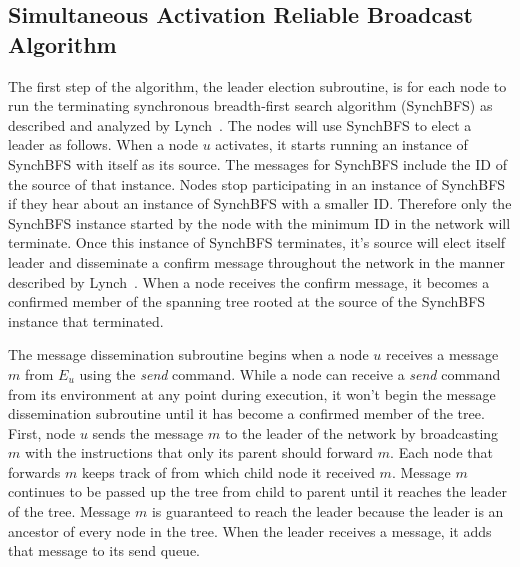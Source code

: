 \documentclass[english]{article}
\begin{document}
  \subsection {Simultaneous Activation Reliable Broadcast Algorithm}

The first step of the algorithm, the leader election subroutine, is for each node to run the terminating synchronous breadth-first search algorithm (SynchBFS) as described and analyzed by Lynch~\cite{Lynch:1996}. The nodes will use SynchBFS to elect a leader as follows. When a node $u$ activates, it starts running an instance of SynchBFS with itself as its source. The messages for SynchBFS include the ID of the source of that instance. Nodes stop participating in an instance of SynchBFS if they hear about an instance of SynchBFS with a smaller ID. Therefore only the SynchBFS instance started by the node with the minimum ID in the network will terminate. Once this instance of SynchBFS terminates, it's source will elect itself leader and disseminate a confirm message throughout the network in the manner described by Lynch~\cite{Lynch:1996}. When a node receives the confirm message, it becomes a confirmed member of the spanning tree rooted at the source of the SynchBFS instance that terminated. 

The message dissemination subroutine begins when a node $u$ receives a message $m$ from $E_u$ using the \textit{send} command. While a node can receive a \textit{send} command from its environment at any point during execution, it won't begin the message dissemination subroutine until it has become a confirmed member of the tree. First, node $u$ sends the message $m$ to the leader of the network by broadcasting $m$ with the instructions that only its parent should forward $m$. Each node that forwards $m$ keeps track of from which child node it received $m$. Message $m$ continues to be passed up the tree from child to parent until it reaches the leader of the tree. Message $m$ is guaranteed to reach the leader because the leader is an ancestor of every node in the tree. When the leader receives a message, it adds that message to its send queue.
\end{document}

